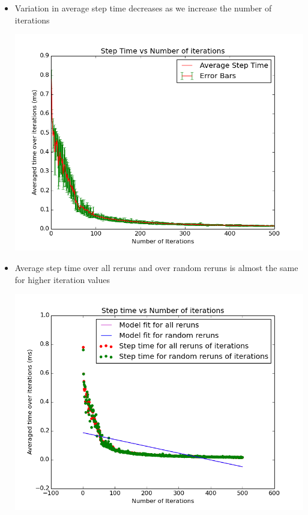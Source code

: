 \documentclass[11pt]{article}
\begin{document}
\begin{itemize}
\begin{center}
\end{center}
\item Variation in average step time decreases as we increase the number of iterations
\begin{center}
\includegraphics[scale=0.45]{images/g13_plot03}
\end{center}
\item Average step time over all reruns and over random reruns is almost the same for higher iteration values
\begin{center}
\includegraphics[scale=0.45]{images/g13_plot05}
\end{center}
\end{itemize}
 
\end{document}
